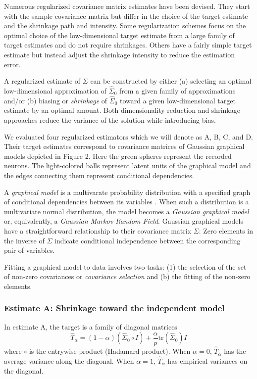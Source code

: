 Numerous regularized covariance matrix estimates have been devised. They start with the sample covariance matrix but differ in the choice of the target estimate and the shrinkage path and intensity. Some regularization schemes focus on the optimal choice of the low-dimensional target estimate from a large family of target estimates and do not require shrinkages.  Others have a fairly simple target estimate but instead adjust the shrinkage intensity to reduce the estimation error.

A regularized estimate of $\Sigma$ can be constructed by either (a) selecting an optimal low-dimensional approximation of $\hat\Sigma_0$ from a given family of approximations and/or (b) biasing or \emph{shrinkage} of $\hat\Sigma_0$ toward a given low-dimensional target estimate by an optimal amount.  Both dimensionality reduction and shrinkage approaches reduce the variance of the solution while introducing bias. 


We evaluated four regularized estimators which we will denote as A, B, C, and D.  Their target estimates correspond to covariance matrices of Gaussian graphical models depicted in Figure 2.  Here the green spheres represent the recorded neurons. The light-colored balls represent latent units of the graphical model and the edges connecting them represent conditional dependencies.



A \emph{graphical model} is a multivarate probability distribution with a specified graph of conditional dependencies between its variables \cite{Koller:2009}.  When such a distribution is a multivariate normal distribution, the model becomes a \emph{Gaussian graphical model} or, equivalently, a \emph{Gaussian Markov Random Field}.  Gaussian graphical models have a straightforward relationship to their covariance matrix $\Sigma$:  Zero elements in the inverse of $\Sigma$ indicate conditional independence between the corresponding pair of variables.  

Fitting a graphical model to data involves two tasks: (1) the selection of the set of non-zero covariances or \emph{covariance selection} \cite{Dempster:1972} and (b) the fitting of the non-zero elements.

\subsubsection*{Estimate A: Shrinkage toward the independent model}
In estimate A, the target is a family of diagonal matrices 
\begin{equation}
\hat T_\alpha = (1-\alpha)(\hat\Sigma_0 \circ I) + \frac \alpha p \mbox{tr}(\hat \Sigma_0)I
\end{equation}
where $\circ$ is the entrywise product (Hadamard product). When $\alpha=0$, $\hat T_\alpha$ has the average variance along the diagonal. When $ \alpha=1$, $ \hat T_\alpha$ has empirical variances on the diagonal.

